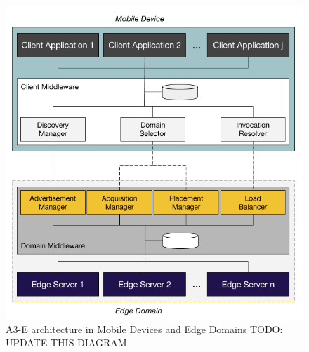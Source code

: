 \begin{figure}[tbp]
	\includegraphics[width=.6\textwidth]{figs/reference-architecture.png}
	\caption{A3-E architecture in Mobile Devices and Edge Domains TODO: UPDATE THIS DIAGRAM}
	\label{fig:reference-architecture}
	\end{figure}